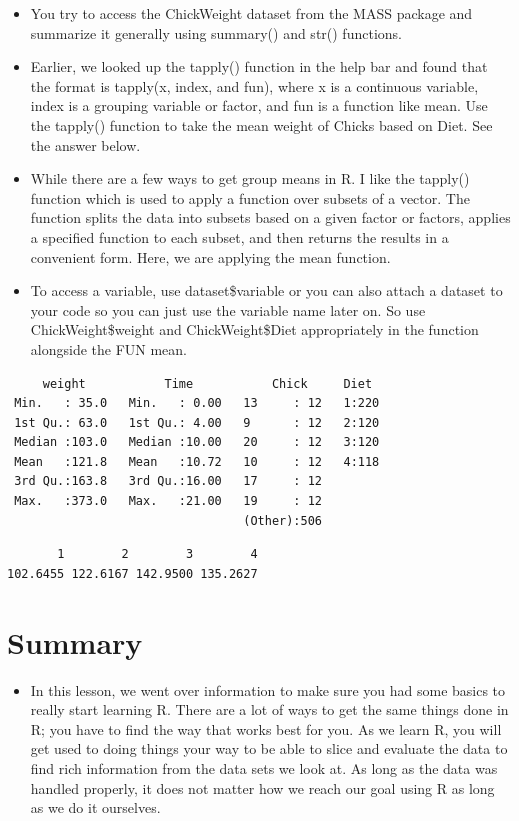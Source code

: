 \documentclass[
  letterpaper,
  DIV=11,
  numbers=noendperiod]{scrreprt}
\providecommand{\tightlist}{%
  \setlength{\itemsep}{0pt}\setlength{\parskip}{0pt}}\usepackage{longtable,booktabs,array}
\begin{document}
\begin{itemize}
\tightlist
\item
  You try to access the ChickWeight dataset from the MASS package and
  summarize it generally using summary() and str() functions.
\item
  Earlier, we looked up the tapply() function in the help bar and found
  that the format is tapply(x, index, and fun), where x is a continuous
  variable, index is a grouping variable or factor, and fun is a
  function like mean. Use the tapply() function to take the mean weight
  of Chicks based on Diet. See the answer below.
\item
  While there are a few ways to get group means in R. I like the
  tapply() function which is used to apply a function over subsets of a
  vector. The function splits the data into subsets based on a given
  factor or factors, applies a specified function to each subset, and
  then returns the results in a convenient form. Here, we are applying
  the mean function.
\item
  To access a variable, use dataset\$variable or you can also attach a
  dataset to your code so you can just use the variable name later on.
  So use ChickWeight\$weight and ChickWeight\$Diet appropriately in the
  function alongside the FUN mean.
\end{itemize}

\begin{verbatim}
     weight           Time           Chick     Diet   
 Min.   : 35.0   Min.   : 0.00   13     : 12   1:220  
 1st Qu.: 63.0   1st Qu.: 4.00   9      : 12   2:120  
 Median :103.0   Median :10.00   20     : 12   3:120  
 Mean   :121.8   Mean   :10.72   10     : 12   4:118  
 3rd Qu.:163.8   3rd Qu.:16.00   17     : 12          
 Max.   :373.0   Max.   :21.00   19     : 12          
                                 (Other):506          
\end{verbatim}

\begin{verbatim}
       1        2        3        4 
102.6455 122.6167 142.9500 135.2627 
\end{verbatim}


\chapter{Summary}\label{summary-1}

\begin{itemize}
\tightlist
\item
  In this lesson, we went over information to make sure you had some
  basics to really start learning R. There are a lot of ways to get the
  same things done in R; you have to find the way that works best for
  you. As we learn R, you will get used to doing things your way to be
  able to slice and evaluate the data to find rich information from the
  data sets we look at. As long as the data was handled properly, it
  does not matter how we reach our goal using R as long as we do it
  ourselves.
\end{itemize}
\end{document}
